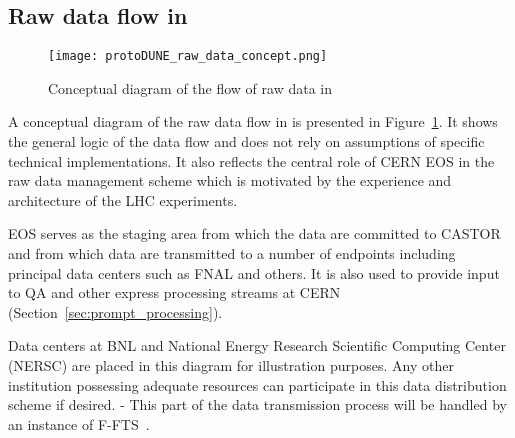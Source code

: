 \subsection{Raw data flow in \pdsp}
\label{sec:raw_concept}

\begin{figure}[tbh]
\centering\texttt{[image: protoDUNE\_raw\_data\_concept.png]}
\caption{\label{fig:raw_concept}Conceptual diagram of the flow of raw data in \pdsp}
\end{figure}


A conceptual diagram of the raw data flow in \pdsp is presented in Figure~\ref{fig:raw_concept}. It shows the general logic
of the data flow and does not rely on assumptions of specific technical implementations. 
It also reflects the central role of CERN EOS in the \pdsp raw data management scheme which is motivated by the experience
and architecture of the LHC experiments.

EOS serves as the staging area from which the data are committed to CASTOR
and from which data are transmitted to a number of endpoints including principal data centers such as FNAL and others.
It is also used to provide input to QA and other express processing streams at CERN (Section~\ref{sec:prompt_processing}).

Data centers at BNL and National Energy Research Scientific Computing Center (NERSC)
are placed in this diagram for illustration purposes. Any other institution possessing adequate
resources can participate in this data distribution scheme if desired.
-
 This part of the data transmission process will be handled by an instance of F-FTS~\cite{docdb1212}.



